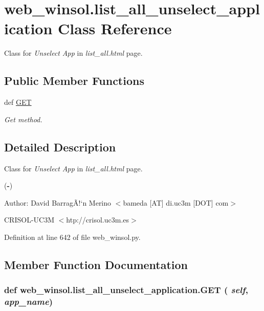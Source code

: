 \hypertarget{classweb__winsol_1_1list__all__unselect__application}{
\section{web\_\-winsol.list\_\-all\_\-unselect\_\-application Class Reference}
\label{classweb__winsol_1_1list__all__unselect__application}
}
Class for {\em Unselect\/} {\em App\/} in {\em list\_\-all.html\/} page.  


\subsection*{Public Member Functions}
\begin{CompactItemize}
\item 
def \hyperlink{classweb__winsol_1_1list__all__unselect__application_7265fd9e570de8809164553faa64a10f}{GET}
\begin{CompactList}\small\item\em Get method. \item\end{CompactList}\end{CompactItemize}


\subsection{Detailed Description}
Class for {\em Unselect\/} {\em App\/} in {\em list\_\-all.html\/} page. 

({\bf -})

\begin{Desc}
\item[Author:]David Barrag\~{A}!`n Merino $<$bameda \mbox{[}AT\mbox{]} di.uc3m \mbox{[}DOT\mbox{]} com$>$ 

CRISOL-UC3M $<$htp://crisol.uc3m.es$>$ \end{Desc}




Definition at line 642 of file web\_\-winsol.py.

\subsection{Member Function Documentation}
\hypertarget{classweb__winsol_1_1list__all__unselect__application_7265fd9e570de8809164553faa64a10f}{
\subsubsection[GET]{\setlength{\rightskip}{0pt plus 5cm}def web\_\-winsol.list\_\-all\_\-unselect\_\-application.GET ( {\em self},  {\em app\_\-name})}}
\label{classweb__winsol_1_1list__all__unselect__application_7265fd9e570de8809164553faa64a10f}


